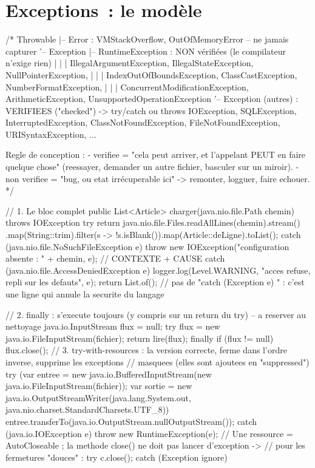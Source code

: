\section{Exceptions~: le mod\`ele}

\begin{codejava}
/*
  Throwable
   |-- Error                    : VMStackOverflow, OutOfMemoryError -- ne jamais capturer
   '-- Exception
        |-- RuntimeException    : NON v\'erifi\'ees (le compilateur n'exige rien)
        |   |   |     IllegalArgumentException, IllegalStateException, NullPointerException,
        |   |   |     IndexOutOfBoundsException, ClassCastException, NumberFormatException,
        |   |   |     ConcurrentModificationException, ArithmeticException, UnsupportedOperationException
        '-- Exception (autres)  : VERIFIEES ("checked") -> try/catch ou throws
              IOException, SQLException, InterruptedException,
              ClassNotFoundException, FileNotFoundException, URISyntaxException, ...

  Regle de conception :
    - verifiee   = "cela peut arriver, et l'appelant PEUT en faire quelque chose" (reessayer,
                   demander un autre fichier, basculer sur un miroir).
    - non verifiee = "bug, ou etat irr\'ecuperable ici" -> remonter, logguer, faire echouer.
*/

// 1. Le bloc complet
public List<Article> charger(java.nio.file.Path chemin) throws IOException {
    try {
        return java.nio.file.Files.readAllLines(chemin).stream()
                .map(String::trim).filter(s -> !s.isBlank()).map(Article::deLigne).toList();
    } catch (java.nio.file.NoSuchFileException e) {
        throw new IOException("configuration absente : " + chemin, e);   // CONTEXTE + CAUSE
    } catch (java.nio.file.AccessDeniedException e) {
        logger.log(Level.WARNING, "acces refuse, repli sur les defauts", e);
        return List.of();
    }
    // pas de "catch (Exception e) { }" : c'est une ligne qui annule la securite du langage
}

// 2. finally : s'execute toujours (y compris sur un return du try) -- a reserver au nettoyage
java.io.InputStream flux = null;
try {
    flux = new java.io.FileInputStream(fichier);
    return lire(flux);
} finally {
    if (flux != null) { flux.close(); }
}
// 3. try-with-resources : la version correcte, ferme dans l'ordre inverse, supprime les exceptions
//    masquees (elles sont ajoutees en "suppressed")
try (var entree = new java.io.BufferedInputStream(new java.io.FileInputStream(fichier));
     var sortie = new java.io.OutputStreamWriter(java.lang.System.out, java.nio.charset.StandardCharsets.UTF_8)) {
    entree.transferTo(java.io.OutputStream.nullOutputStream());
} catch (java.io.IOException e) {
    throw new RuntimeException(e);
}
// Une ressource = AutoCloseable ; la methode close() ne doit pas lancer d'exception ->
// pour les fermetures "douces" : try { c.close(); } catch (Exception ignore) { }


\end{codejava}
